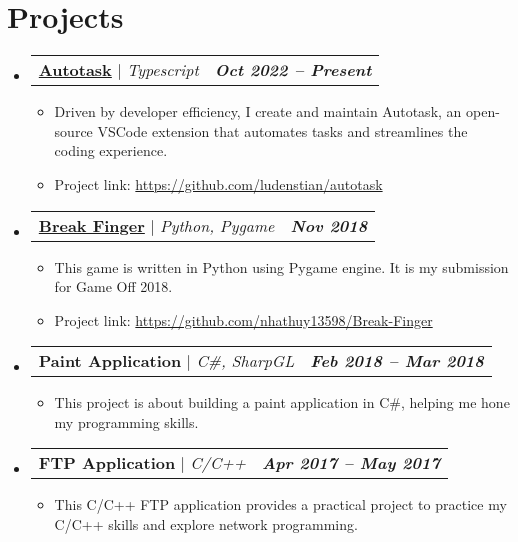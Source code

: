 \documentclass[letterpaper,1pt]{article}
\makeatletter
\newcommand{\subheadingtitlevspace}{
\vspace{-3pt}
}
\newcommand{\resumeItem}[1]{
  \item\large{
    {#1 \vspace{-4pt}}
  }
}
\newcommand{\titleItem}[1]{
  \large\textbf{#1}
}
\newcommand{\resumeProjectHeading}[2]{
    \item
    \begin{tabular*}{0.97\textwidth}{l@{\extracolsep{\fill}}r}
      #1 & \textit{\large #2} \\
    \end{tabular*}\vspace{-9pt}
}
\newcommand{\resumeSubHeadingListStart}{\subheadingtitlevspace\begin{itemize}[leftmargin=0.15in, label={}]}
\newcommand{\resumeSubHeadingListEnd}{\end{itemize}}
\newcommand{\resumeItemListStart}{
\begin{itemize}}
\newcommand{\resumeItemListEnd}{
\end{itemize}\vspace{-8pt}}
\makeatother
\begin{document}
 \section{Projects}    
     \resumeSubHeadingListStart
        \resumeProjectHeading
           {\titleItem{\href{https://github.com/ludenstian/autotask}{Autotask}} $|$ \emph{Typescript}}{\textbf{Oct 2022 -- Present}}
            \resumeItemListStart
            \resumeItem{Driven by developer efficiency, I create and maintain Autotask, an open-source VSCode extension that automates tasks and streamlines the coding experience.}
            \resumeItem{Project link: \href{https://github.com/ludenstian/autotask}{https://github.com/ludenstian/autotask}}
           \resumeItemListEnd
       \resumeProjectHeading
           {\titleItem{\href{https://nhathuy13598.itch.io/break-finger}{Break Finger}} $|$ \emph{Python, Pygame}}{\textbf{Nov 2018}}
            \resumeItemListStart
            \resumeItem{This game is written in Python using Pygame engine. It is my submission for Game Off 2018.} 
            \resumeItem{Project link: \href{https://github.com/nhathuy13598/Break-Finger}{https://github.com/nhathuy13598/Break-Finger}}
           \resumeItemListEnd
       \resumeProjectHeading
           {\titleItem{Paint Application} $|$ \emph{C\#, SharpGL}}{\textbf{Feb 2018 -- Mar 2018}}
            \resumeItemListStart
            \resumeItem{This project is about building a paint application in C\#, helping me hone my programming skills.}
           \resumeItemListEnd
        \resumeProjectHeading
           {\titleItem{FTP Application} $|$ \emph{C/C++}}{\textbf{Apr 2017 -- May 2017}}
            \resumeItemListStart
            \resumeItem{This C/C++ FTP application provides a practical project to practice my C/C++ skills and explore network programming.}
           \resumeItemListEnd
     \resumeSubHeadingListEnd

\end{document}

